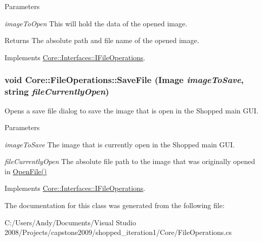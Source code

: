 \begin{DoxyParams}{Parameters}
\item[{\em imageToOpen}]This will hold the data of the opened image. \end{DoxyParams}
\begin{DoxyReturn}{Returns}
The absolute path and file name of the opened image. 
\end{DoxyReturn}


Implements \hyperlink{interface_core_1_1_interfaces_1_1_i_file_operations}{Core::Interfaces::IFileOperations}.\hypertarget{class_core_1_1_file_operations_a4437acc296a0a32cdf8727ef5a7e94ce}{
\subsubsection[{SaveFile}]{\setlength{\rightskip}{0pt plus 5cm}void Core::FileOperations::SaveFile (Image {\em imageToSave}, \/  string {\em fileCurrentlyOpen})}}
\label{class_core_1_1_file_operations_a4437acc296a0a32cdf8727ef5a7e94ce}
Opens a save file dialog to save the image that is open in the Shopped main GUI.


\begin{DoxyParams}{Parameters}
\item[{\em imageToSave}]The image that is currently open in the Shopped main GUI. \item[{\em fileCurrentlyOpen}]The absolute file path to the image that was originally opened in \hyperlink{class_core_1_1_file_operations_a23fa84c311fb8051caa8e751d99ef027}{OpenFile()} \end{DoxyParams}


Implements \hyperlink{interface_core_1_1_interfaces_1_1_i_file_operations}{Core::Interfaces::IFileOperations}.

The documentation for this class was generated from the following file:\begin{DoxyCompactItemize}
\item 
C:/Users/Andy/Documents/Visual Studio 2008/Projects/capstone2009/shopped\_\-iteration1/Core/FileOperations.cs\end{DoxyCompactItemize}
